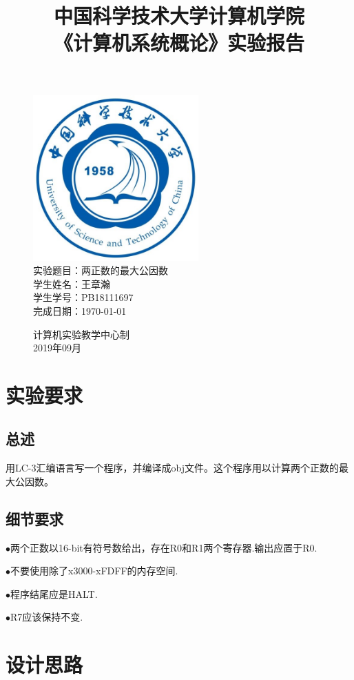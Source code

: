\documentclass[UTF8]{article}
\title{中国科学技术大学计算机学院\\《计算机系统概论》实验报告}
\author{}
\date{}
\newcommand{\keypoint}[1]{$\bullet$\quad#1\par}
\begin{document}
	\maketitle
	\begin{figure}[H]
		\centering
		\includegraphics[width=2.5in]{xiaohui.jpg}\vspace{0.5cm}\\
		\large{
			实验题目：两正数的最大公因数\\
			学生姓名：王章瀚\\
			学生学号：PB18111697\\
			完成日期：\today\\
		}\vspace{2cm}
		
		\large{计算机实验教学中心制\\2019年09月\\}
		\thispagestyle{empty}
		\clearpage  %
	\end{figure}


	\section{实验要求}
	\subsection{总述}
	用LC-3汇编语言写一个程序，并编译成obj文件。这个程序用以计算两个正数的最大公因数。
	\subsection{细节要求}
	\keypoint{两个正数以16-bit有符号数给出，存在R0和R1两个寄存器.输出应置于R0.}
	\keypoint{不要使用除了x3000-xFDFF的内存空间.}
	\keypoint{程序结尾应是HALT.}
	\keypoint{R7应该保持不变.}
	
	
	\section{设计思路}
\end{document}
